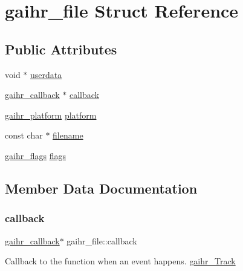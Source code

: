 \hypertarget{structgaihr__file}{}\section{gaihr\+\_\+file Struct Reference}
\label{structgaihr__file}
\subsection*{Public Attributes}
\begin{DoxyCompactItemize}
\item 
void $\ast$ \hyperlink{structgaihr__file_a06bf963cb9c08e69fcc6c4bb3140a2b8}{userdata}
\item 
\hyperlink{gai__hotreload_8h_a8026f464cf8636b763b6f03798d40800}{gaihr\+\_\+callback} $\ast$ \hyperlink{structgaihr__file_a9ac45c0142ff1eaf591b870e163d7f31}{callback}
\item 
\hyperlink{structgaihr__platform}{gaihr\+\_\+platform} \hyperlink{structgaihr__file_a138044c270d5f0e83917ae2841efe8b7}{platform}
\item 
const char $\ast$ \hyperlink{structgaihr__file_a26ea2bbf62231c3cae2317ca217f8166}{filename}
\item 
\hyperlink{gai__hotreload_8h_aaebb069b6896f065efd75640e0e4150b}{gaihr\+\_\+flags} \hyperlink{structgaihr__file_ab6eef82d50a8a51d161de3ab7ad98ee9}{flags}
\end{DoxyCompactItemize}


\subsection{Member Data Documentation}
\mbox{\label{structgaihr__file_a9ac45c0142ff1eaf591b870e163d7f31}} 
\subsubsection{\texorpdfstring{callback}{callback}}
{\footnotesize\ttfamily \hyperlink{gai__hotreload_8h_a8026f464cf8636b763b6f03798d40800}{gaihr\+\_\+callback}$\ast$ gaihr\+\_\+file\+::callback}

Callback to the function when an event happens. \hyperlink{gai__hotreload_8h_ad83d8f6170f0404fb72803d012ac9f6a}{gaihr\+\_\+\+Track} \mbox{\label{structgaihr__file_a26ea2bbf62231c3cae2317ca217f8166}} 
